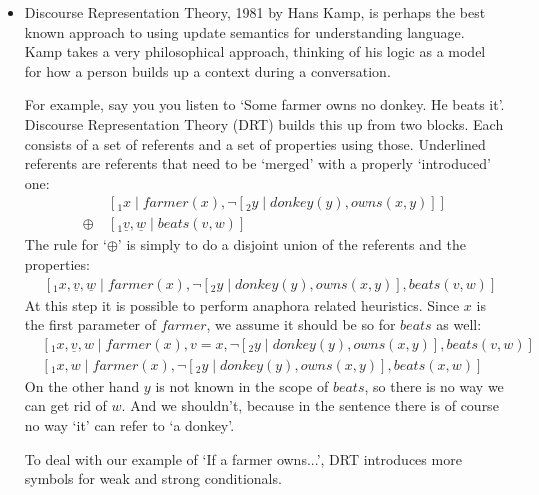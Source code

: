 \documentclass[12pt]{article}
\begin{document}
\begin{itemize}
\item Discourse Representation Theory, 1981 by Hans Kamp\cite{kamp1981theory}, is perhaps the best known approach to using update semantics for understanding language. Kamp takes a very philosophical approach, thinking of his logic as a model for how a person builds up a context during a conversation.

For example, say you you listen to `Some farmer owns no donkey. He beats it'. Discourse Representation Theory (DRT) builds this up from two blocks. Each consists of a set of referents and a set of properties using those. Underlined referents are referents that need to be `merged' with a properly `introduced' one:
%
\begin{align}
&[_1 x\mid farmer(x), \neg[_2 y\mid donkey(y), owns(x,y)] ] \nonumber\\
\oplus\ & [_1 \underline{v}, \underline{w}\mid beats(v,w) ] \nonumber
\end{align}
%
The rule for `$\oplus$' is simply to do a disjoint union of the referents and the properties:
%
\begin{align}
&[_1 x, \underline{v}, \underline{w}\mid farmer(x), \neg[_2 y\mid donkey(y), owns(x,y)], beats(v,w) ] \nonumber
\end{align}
%
At this step it is possible to perform anaphora related heuristics. Since $x$ is the first parameter of $farmer$, we assume it should be so for $beats$ as well:
%
\begin{align}
&[_1 x, \underline{v}, w\mid farmer(x), v=x, \neg[_2 y\mid donkey(y), owns(x,y)], beats(v,w) ] \nonumber\\
&[_1 x, w\mid farmer(x), \neg[_2 y\mid donkey(y), owns(x,y)], beats(x,w) ]\nonumber
\end{align}
%
On the other hand $y$ is not known in the scope of $beats$, so there is no way we can get rid of $w$. And we shouldn't, because in the sentence there is of course no way `it' can refer to `a donkey'.

To deal with our example of `If a farmer owns...', DRT introduces more symbols for weak and strong conditionals.



\end{itemize}
\end{document}
